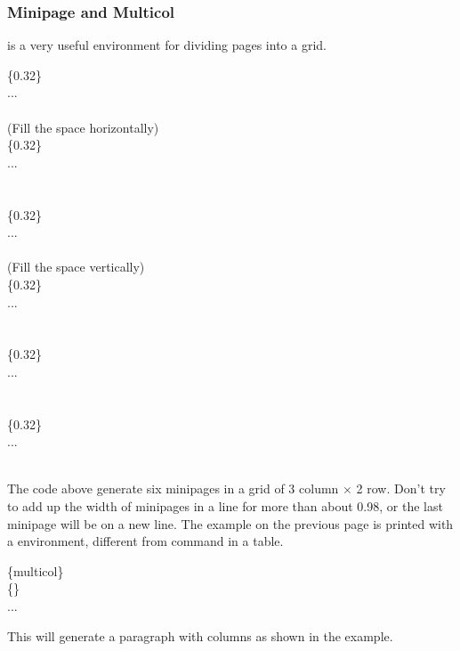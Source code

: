 \begin{frame}
	\frametitle{Minipage and Multicol}
	 is a very useful environment for dividing pages into a grid.
	\begin{example}
		\begin{multicols}{2}
			\{0.32\}\\
			\qquad ...\\
			\\
			 (Fill the space horizontally)\\
			\{0.32\}\\
			\qquad ...\\
			\\
			\\
			\{0.32\}\\
			\qquad ...\\
			\\
			 (Fill the space vertically)\\
			\{0.32\}\\
			\qquad ...\\
			\\
			\\
			\{0.32\}\\
			\qquad ...\\
			\\
			\\
			\{0.32\}\\
			\qquad ...\\
			\\
		\end{multicols}	
	\end{example}
\end{frame}

\begin{frame}
	The code above generate six minipages in a grid of 3 column $\times$ 2 row. Don't try to add up the width of minipages in a line for more than about 0.98, or the last minipage will be on a new line.
	The example on the previous page is printed with a   environment, different from  command in a table.
	\begin{command}
		\{multicol\}\\
		\{\}\\
		\qquad ...\\
	\end{command}
	This will generate a paragraph with  columns as shown in the example.	
\end{frame}

